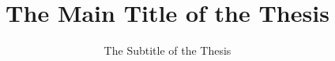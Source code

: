 \documentclass[
  uofacolor,
  BCOR=12mm,     %
  open=odd,      %
  cleardoublepage=plain,
  DIV=15
]{uofathesis}
\author{\myfont{Albert Einstein}}
\title{\Huge The Main Title of the Thesis}
\subtitle{\LARGE The Subtitle of the Thesis}
\date{\myfont{October 2018}}
\begin{document}
\frontmatter

\maketitle

\makeadvisorpage






\tableofcontents

\newcommand{\p}[1]{\textcolor{uofadarkblue}{\texttt{#1}}}

\mainmatter






\appendix



\backmatter
\printbibliography
\end{document}
